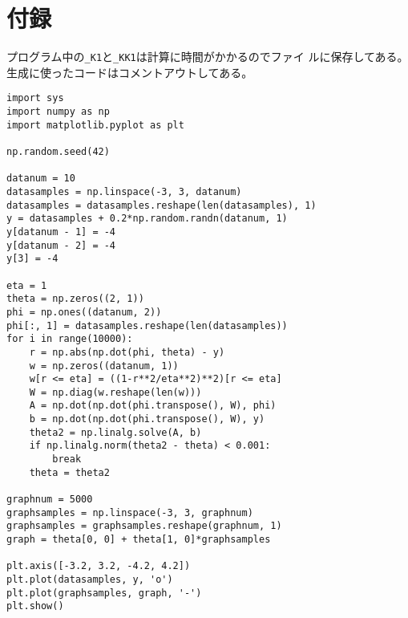 \documentclass[9pt]{ltjsarticle}
\begin{document}
\section*{付録}
プログラム中の\texttt{\_K1}と\texttt{\_KK1}は計算に時間がかかるのでファイ
ルに保存してある。生成に使ったコードはコメントアウトしてある。
\tiny
\begin{verbatim}
import sys
import numpy as np
import matplotlib.pyplot as plt

np.random.seed(42)

datanum = 10
datasamples = np.linspace(-3, 3, datanum)
datasamples = datasamples.reshape(len(datasamples), 1)
y = datasamples + 0.2*np.random.randn(datanum, 1)
y[datanum - 1] = -4
y[datanum - 2] = -4
y[3] = -4

eta = 1
theta = np.zeros((2, 1))
phi = np.ones((datanum, 2))
phi[:, 1] = datasamples.reshape(len(datasamples))
for i in range(10000):
    r = np.abs(np.dot(phi, theta) - y)
    w = np.zeros((datanum, 1))
    w[r <= eta] = ((1-r**2/eta**2)**2)[r <= eta]
    W = np.diag(w.reshape(len(w)))
    A = np.dot(np.dot(phi.transpose(), W), phi)
    b = np.dot(np.dot(phi.transpose(), W), y)
    theta2 = np.linalg.solve(A, b)
    if np.linalg.norm(theta2 - theta) < 0.001:
        break
    theta = theta2

graphnum = 5000
graphsamples = np.linspace(-3, 3, graphnum)
graphsamples = graphsamples.reshape(graphnum, 1)
graph = theta[0, 0] + theta[1, 0]*graphsamples

plt.axis([-3.2, 3.2, -4.2, 4.2])    
plt.plot(datasamples, y, 'o')
plt.plot(graphsamples, graph, '-')
plt.show()
\end{verbatim}
\end{document}
